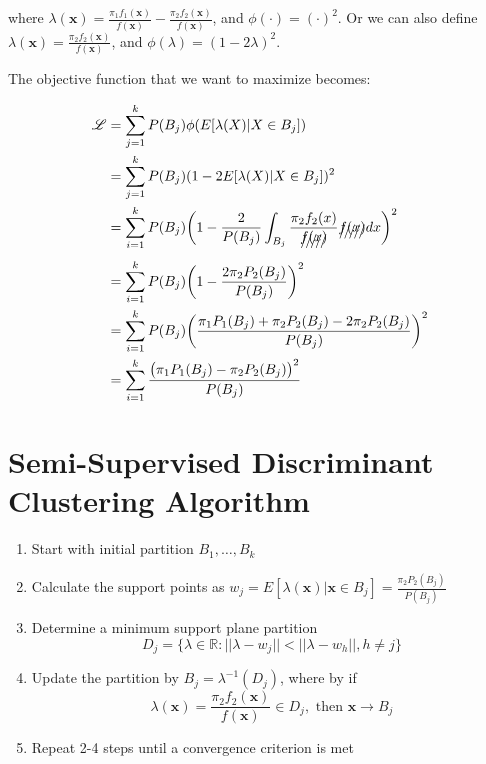 \documentclass{article}
\begin{document}
where $\lambda(\pmb x) = \frac{\pi_1f_1(\pmb x)}{f(\pmb x)} - \frac{\pi_2f_2(\pmb x)}{f(\pmb x)}$, and $\phi(\cdot) = (\cdot)^2$. Or we can also define $\lambda(\pmb x) = \frac{\pi_2f_2(\pmb x)}{f(\pmb x)}$, and $\phi(\lambda) = (1 - 2\lambda)^2$.

The objective function that we want to maximize becomes:


\begin{align}
	\mathscr L &= \sum_{j=1}^k P(B_j)\phi(E[\lambda(X) | X\in B_j]) \\
	& = \sum_{j=1}^k P(B_j)(1- 2E[\lambda (X) | X\in B_j])^2\\
	& = \sum_{i=1}^k P(B_j)\bigg( 1 - \frac{2}{P(B_j)}\int_{B_j}\frac{\pi_2f_2(x)}{\xout{f(x)}} \xout{f(x)} dx \bigg)^2\\
	& = \sum_{i=1}^k P(B_j) \bigg(1 -  \frac{2\pi_2P_2(B_j)}{P(B_j)} \bigg)^2\\
	& = \sum_{i=1}^k P(B_j) \bigg( \frac{\pi_1P_1(B_j) + \pi_2P_2(B_j) - 2\pi_2P_2(B_j)}{P(B_j)} \bigg)^2 \\
	& = \sum_{i=1}^k \frac{\big(\pi_1P_1(B_j) - \pi_2P_2(B_j)\big)^2}{P(B_j)}
\end{align}

\section{Semi-Supervised Discriminant Clustering Algorithm}

\begin{enumerate}
	\item Start with initial partition $B_1, \ldots, B_k$ 
	\item Calculate the support points as $w_j = E[\lambda(\pmb x)|\pmb x\in B_j] = \frac{\pi_2P_2(B_j)}{P(B_j)}$
	\item Determine a minimum support plane partition  \\ \vspace{-5mm} \begin{equation}
		D_j = \{ \lambda \in \mathbb R: ||\lambda - w_j|| < ||\lambda - w_h||, h\neq j \}
	\end{equation}
	\item Update the partition by $B_j = \lambda^{-1}(D_j)$, where by if \\ \begin{equation}
		\lambda(\pmb x) = \frac{\pi_2f_2(\pmb x)}{f(\pmb x)} \in D_j, \text{ then } \pmb x \to B_j
	\end{equation}
	\item Repeat 2-4 steps until a convergence criterion is met
\end{enumerate}
\end{document}

